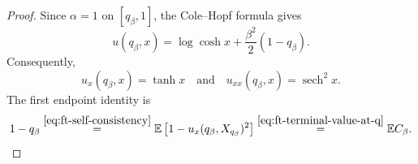\documentclass[10pt]{amsart}
\theoremstyle{definition}
\theoremstyle{remark}
\numberwithin{equation}{section}
\newcommand{\E}{\mathbb E}
\newcommand{\1}{\mathbf 1}
\newcommand{\sech}{\operatorname{sech}}
\newcommand{\stackref}[2]{\stackrel{#2}{#1}}
\begin{document}
\begin{proof}
Since $\alpha=1$ on $[q_\beta,1]$, the Cole--Hopf formula gives
\begin{equation}
 u(q_\beta,x)=\log\cosh x
 +\frac{\beta^2}{2}(1-q_\beta).
 \label{eq:ft-terminal-value-at-q}
\end{equation}
Consequently,
\begin{equation*}
 u_x(q_\beta,x)=\tanh x
 \quad\text{and}\quad
 u_{xx}(q_\beta,x)=\sech^2x.
\end{equation*}
The first endpoint identity is
\begin{equation*}
 1-q_\beta
 \stackref{=}{\eqref{eq:ft-self-consistency}}
 \E\left[1-u_x(q_\beta,X_{q_\beta})^2\right]
 \stackref{=}{\eqref{eq:ft-terminal-value-at-q}}
 \E C_\beta.
\end{equation*}


\end{proof}
\end{document}
